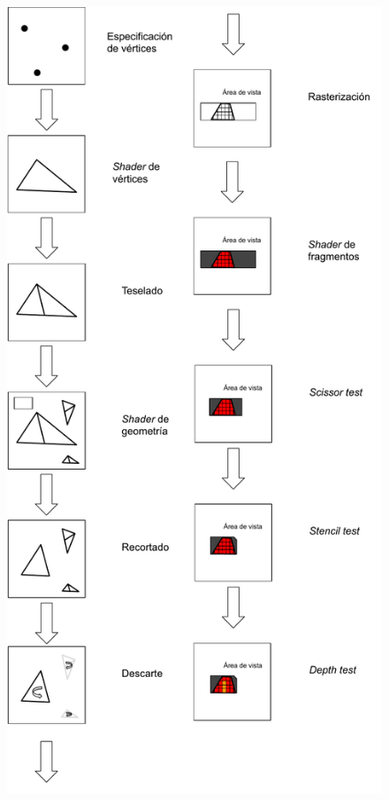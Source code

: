 \vspace{5mm}
\begin{figure}[htbp]
	\centering
	\includegraphics[width=0.55\linewidth]{assets/OpenGL}
	\label{img:pipelinegl}
\end{figure}

